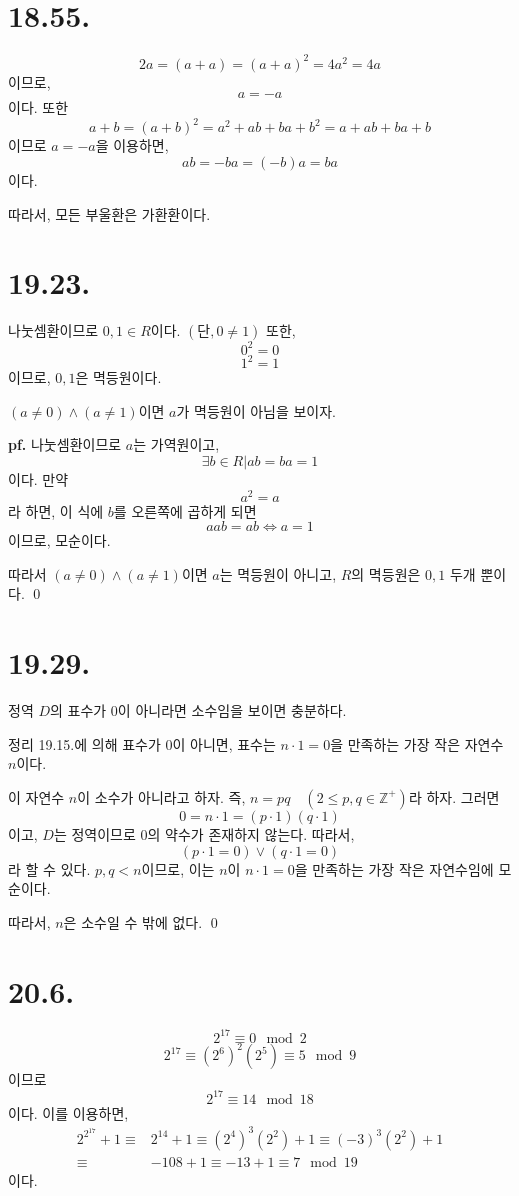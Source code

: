 \documentclass{article}
\begin{document}
\section{18.55.}
$$2a = (a + a) = (a + a) ^ 2 = 4a^2 = 4a$$
이므로,
$$a = -a$$이다. 또한
$$a+b = (a+b)^2 = a^2 + ab + ba + b^2 = a + ab + ba + b$$
이므로 $a = -a$을 이용하면,
$$ab = -ba = (-b)a = ba$$이다.

따라서, 모든 부울환은 가환환이다.

\section{19.23.}
나눗셈환이므로 $0, 1 \in R$이다. $(\text{단}, 0 \neq 1)$
또한, $$0^2 = 0$$ $$1^2 = 1$$이므로, $0, 1$은 멱등원이다.

$(a \neq 0) \wedge (a \neq 1)$이면 $a$가 멱등원이 아님을 보이자.

\textbf{pf.} 나눗셈환이므로 $a$는 가역원이고, 
$$\exists b \in R \bigg| ab = ba = 1$$이다. 만약 $$a^2 = a$$라 하면, 이 식에 $b$를 오른쪽에 곱하게 되면
$$aab = ab \iff a = 1$$
이므로, 모순이다. 

따라서 $(a \neq 0) \wedge (a \neq 1)$이면 $a$는 멱등원이 아니고, $R$의 멱등원은 $0, 1$ 두개 뿐이다. \qed

\section{19.29.}
정역 $D$의 표수가 $0$이 아니라면 소수임을 보이면 충분하다.

정리 19.15.에 의해 표수가 0이 아니면, 표수는 $n \cdot 1 = 0$을 만족하는 가장 작은 자연수 $n$이다.

이 자연수 $n$이 소수가 아니라고 하자. 즉, $n = pq \quad (2 \le p, q \in \mathbb{Z}^+)$라 하자. 그러면 
$$0 = n \cdot 1 = (p \cdot 1) (q \cdot 1)$$이고, $D$는 정역이므로 $0$의 약수가 존재하지 않는다. 따라서, $$(p \cdot 1 = 0) \vee (q \cdot 1 = 0)$$라 할 수 있다. $p, q < n$이므로, 이는 $n$이 $n \cdot 1 = 0$을 만족하는 가장 작은 자연수임에 모순이다.

따라서, $n$은 소수일 수 밖에 없다. \qed

\section{20.6.}
$$2^{17} \equiv 0 \mod 2$$
$$2^{17} \equiv (2^6)^2 (2^5) \equiv 5 \mod 9$$
이므로
$$2^{17} \equiv 14 \mod 18$$
이다. 이를 이용하면,
\begin{align*}
2^{2^{17}} + 1 \equiv& 2^{14} + 1 \equiv (2^4)^3 (2^2) + 1 \equiv (-3)^3 (2^2) + 1
\\ \equiv& -108 + 1 \equiv -13 + 1 \equiv 7 \mod 19
\end{align*}
이다.
\end{document}

